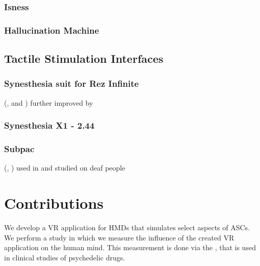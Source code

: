 \subsubsection{Isness}
\autocite{glowacki2020isness}

\subsubsection{Hallucination Machine}
\autocite{suzuki2018hallucination}

\subsection{Tactile Stimulation Interfaces}\label{sec:tactile_stimulation_interfaces}

\subsubsection{Synesthesia suit for Rez Infinite}\label{sec:synesthesia_suit}
(\textcite{konishi2016synesthesia1}, \textcite{konishi2016synesthesia2} and \textcite{synesthesia2016suit})
further improved by \autocite{furukawa2019synesthesia}
\textcite{outram2017crystal}

\subsubsection{Synesthesia X1 - 2.44}
\autocite{synesthesia2021x1}

\subsubsection{Subpac}
(\textcite{subpac2013subpac}, \textcite{drempetic2017wearable})
used in \autocite{zimmermann2016longing}
and studied on deaf people \autocite{schmitz2020hearing}


\section{Contributions}
We develop a \ac{VR} application for \acp{HMD} that simulates select aspects of \acp{ASC}.
We perform a study in which we measure the influence of the created \ac{VR} application on the human mind. This measurement is done via the , that is used in clinical studies of psychedelic drugs.
